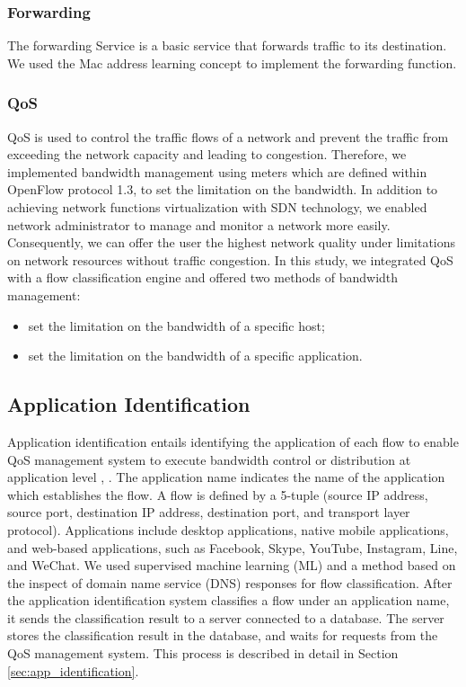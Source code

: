 \documentclass[10pt,journal]{IEEEtran}
\begin{document}
\subsubsection{Forwarding}
The forwarding Service is a basic service that forwards traffic to its destination. We used the Mac address learning concept to implement the forwarding function.

\subsubsection{QoS}
QoS is used to control the traffic flows of a network and prevent the traffic from exceeding the network capacity and leading to congestion. Therefore, we implemented bandwidth management using meters which are defined within OpenFlow protocol 1.3, to set the limitation on the bandwidth. In addition to achieving network functions virtualization with SDN technology, we enabled network administrator to manage and monitor a network more easily. Consequently, we can offer the user the highest network quality under limitations on network resources without traffic congestion.
In this study, we integrated QoS with a flow classification engine and offered two methods of bandwidth management:

\begin{itemize}[]
\item set the limitation on the bandwidth of a specific host;
\item set the limitation on the bandwidth of a specific application.
\end{itemize}



\subsection{Application Identification}
Application identification entails identifying the application of each flow to enable QoS management system
to execute bandwidth control or distribution at application level \cite{dynamic-qos-umeida}, \cite{network-slicing-asia-pacific}. The application name indicates the name of the application which establishes the flow. A flow is defined by a 5-tuple (source IP address, source port, destination IP address, destination port, and transport layer protocol). Applications include desktop applications, native mobile applications, and web-based applications, such as Facebook, Skype, YouTube, Instagram, Line, and WeChat. We used supervised machine learning (ML) and a method based on the inspect of domain name service (DNS) responses for flow classification. After the application identification system classifies a flow under an application name, it sends the classification result to a server connected to a database. The server stores the classification result in the database, and waits for requests from the QoS management system. This process is described in detail in Section \ref{sec:app_identification}.
\end{document}
